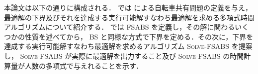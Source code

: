 本論文は以下の通りに構成される． では \textcite{czyzowicz} による自転車共有問題の定義を与え，最適解の下界及びそれを達成する実行可能解すなわち最適解を求める多項式時間アルゴリズムについて紹介する． では FSABS を定義し，その解に関わるいくつかの性質を述べてから， BS と同様な方式で下界を定める．その次に，下界を達成する実行可能解すなわち最適解を求めるアルゴリズム \textsc{Solve-FSABS} を提案し， \textsc{Solve-FSABS} が実際に最適解を出力すること及び \textsc{Solve-FSABS} の時間計算量が人数の多項式で与えれることを示す．

